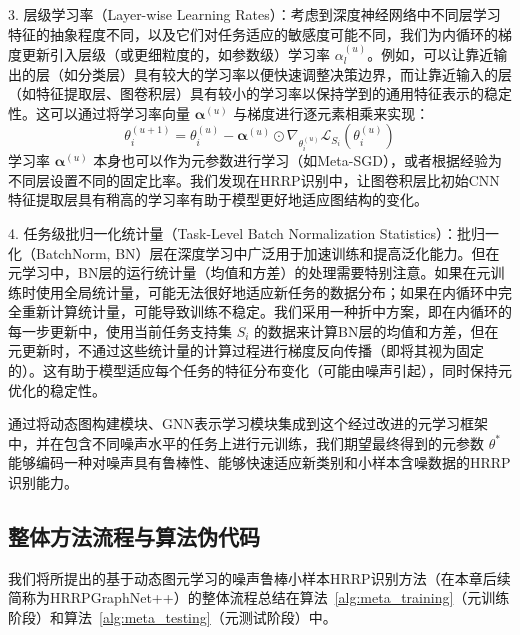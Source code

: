 3.  层级学习率（Layer-wise Learning Rates）：考虑到深度神经网络中不同层学习特征的抽象程度不同，以及它们对任务适应的敏感度可能不同，我们为内循环的梯度更新引入层级（或更细粒度的，如参数级）学习率 $\alpha^{(u)}_l$。例如，可以让靠近输出的层（如分类层）具有较大的学习率以便快速调整决策边界，而让靠近输入的层（如特征提取层、图卷积层）具有较小的学习率以保持学到的通用特征表示的稳定性。这可以通过将学习率向量 $\boldsymbol{\alpha}^{(u)}$ 与梯度进行逐元素相乘来实现：
    \begin{equation}
        \theta_i^{(u+1)} = \theta_i^{(u)} - \boldsymbol{\alpha}^{(u)} \odot \nabla_{\theta_i^{(u)}} \mathcal{L}_{S_i}(\theta_i^{(u)})
        \label{eq:layerwise_lr_update}
    \end{equation}
    学习率 $\boldsymbol{\alpha}^{(u)}$ 本身也可以作为元参数进行学习（如Meta-SGD），或者根据经验为不同层设置不同的固定比率。我们发现在HRRP识别中，让图卷积层比初始CNN特征提取层具有稍高的学习率有助于模型更好地适应图结构的变化。

4.  任务级批归一化统计量（Task-Level Batch Normalization Statistics）：批归一化（BatchNorm, BN）层在深度学习中广泛用于加速训练和提高泛化能力。但在元学习中，BN层的运行统计量（均值和方差）的处理需要特别注意。如果在元训练时使用全局统计量，可能无法很好地适应新任务的数据分布；如果在内循环中完全重新计算统计量，可能导致训练不稳定。我们采用一种折中方案，即在内循环的每一步更新中，使用当前任务支持集 $S_i$ 的数据来计算BN层的均值和方差，但在元更新时，不通过这些统计量的计算过程进行梯度反向传播（即将其视为固定的）。这有助于模型适应每个任务的特征分布变化（可能由噪声引起），同时保持元优化的稳定性。

通过将动态图构建模块、GNN表示学习模块集成到这个经过改进的元学习框架中，并在包含不同噪声水平的任务上进行元训练，我们期望最终得到的元参数 $\theta^*$ 能够编码一种对噪声具有鲁棒性、能够快速适应新类别和小样本含噪数据的HRRP识别能力。

\subsection{整体方法流程与算法伪代码}
\label{subsec:algorithm}

我们将所提出的基于动态图元学习的噪声鲁棒小样本HRRP识别方法（在本章后续简称为HRRPGraphNet++）的整体流程总结在算法~\ref{alg:meta_training}（元训练阶段）和算法~\ref{alg:meta_testing}（元测试阶段）中。

